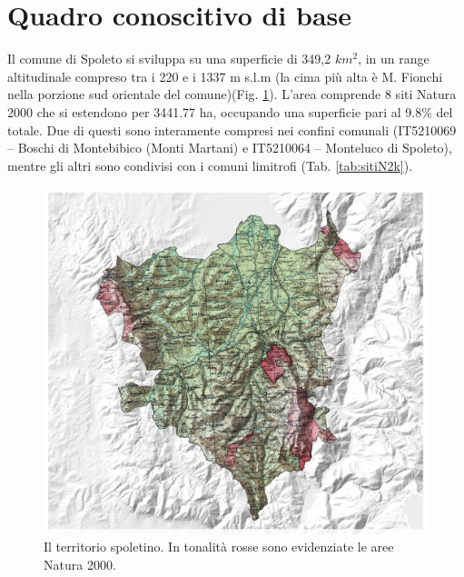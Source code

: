 \documentclass[
  a4paper,
]{book}
\begin{document}
\section{Quadro conoscitivo di base}\label{quadro-conoscitivo-di-base}

Il comune di Spoleto si sviluppa su una superficie di 349,2 \(km^2\), in un range altitudinale compreso tra i 220 e i 1337 m s.l.m (la cima più alta è M. Fionchi nella porzione sud orientale del comune)(Fig. \ref{fig:cartaSpoleto}).
L'area comprende 8 siti Natura 2000 che si estendono per 3441.77 ha, occupando una superficie pari al 9.8\% del totale.
Due di questi sono interamente compresi nei confini comunali (IT5210069 -- Boschi di Montebibico (Monti Martani) e IT5210064 -- Monteluco di Spoleto), mentre gli altri sono condivisi con i comuni limitrofi (Tab. \ref{tab:sitiN2k}).

\begin{figure}

{\centering \includegraphics[width=\linewidth]{./figs/RECSpoleto_map01} 

}

\caption{Il territorio spoletino. In tonalità rosse sono evidenziate le aree Natura 2000.}\label{fig:cartaSpoleto}
\end{figure}
\end{document}
